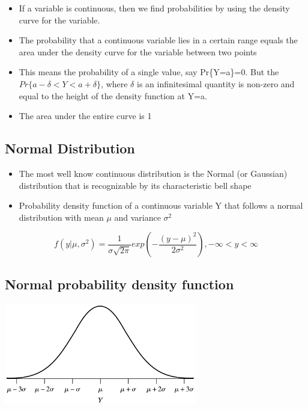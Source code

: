 \documentclass[
]{book}
\providecommand{\tightlist}{%
  \setlength{\itemsep}{0pt}\setlength{\parskip}{0pt}}
\begin{document}
\begin{itemize}
\tightlist
\item
  If a variable is continuous, then we find probabilities by using the density curve for the variable.
\item
  The probability that a continuous variable lies in a certain range equals the area under the density curve for the variable between two points
\item
  This means the probability of a single value, say Pr\{Y=a\}=0. But the \(Pr\{a-\delta<Y<a+\delta\}\), where \(\delta\) is an infinitesimal quantity is non-zero and equal to the height of the density function at Y=a.
\item
  The area under the entire curve is 1
\end{itemize}

\hypertarget{normal-distribution}{%
\subsection{Normal Distribution}\label{normal-distribution}}

\begin{itemize}
\tightlist
\item
  The most well know continuous distribution is the Normal (or Gaussian) distribution that is recognizable by its characteristic bell shape
\item
  Probability density function of a continuous variable Y that follows a normal distribution with mean \(\mu\) and variance \(\sigma^2\)
\end{itemize}

\[f(y|\mu,\sigma^2)=\frac{1}{\sigma\sqrt{2\pi}}exp\left(-\frac{(y-\mu)^2}{2\sigma^2}\right),-\infty<y<\infty\]

\hypertarget{normal-probability-density-function}{%
\subsection{Normal probability density function}\label{normal-probability-density-function}}

\includegraphics[width=0.5\linewidth]{./2_48}
\end{document}
